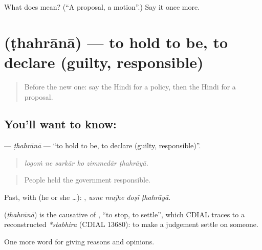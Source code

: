 \begin{tcolorbox}[breakable,colback=teal!4,colframe=teal!35!black,title={Before you move on}]
What does  mean? (\textquotedblleft{}A proposal, a motion\textquotedblright{}.) Say it once more.
\end{tcolorbox}
\section[\texorpdfstring{\hi{ठहराना} (ṭhahrānā)}{ठहराना (ṭhahrānā)}]{ (ṭhahrānā) — to hold to be, to declare (guilty, responsible)}

\label{lesson:HI-C353-thahrana}



\begin{quote}
Before the new one: say the Hindi for a policy, then the Hindi for a proposal.
\end{quote}

\subsection*{You'll want to know: }
\textbf{} — \emph{ṭhahrānā} — \textquotedblleft{}to hold to be, to declare (guilty, responsible)\textquotedblright{}.

\begin{quote}
     
\end{quote}

\begin{quote}
\emph{logoṁ ne sarkār ko zimmedār ṭhahrāyā.}
\end{quote}

\begin{quote}
People held the government responsible.
\end{quote}

Past, with  (he or she …):    , \emph{usne mujhe doṣī ṭhahrāyā}.

\begin{cousinweb}
\textbf{} (\emph{ṭhahrānā}) is the causative of , \textquotedblleft{}to stop, to settle\textquotedblright{}, which CDIAL traces to a reconstructed \emph{*stabhira} (CDIAL 13680): to make a judgement settle on someone.
\end{cousinweb}

\begin{grammarlens}[title={What you've built}]
One more word for giving reasons and opinions.
\end{grammarlens}

